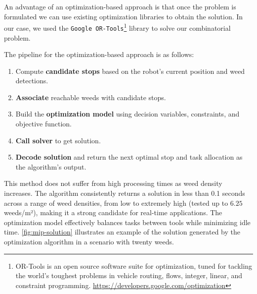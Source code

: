 An advantage of an optimization-based approach is that once the problem is formulated we can use existing optimization libraries to obtain the solution. In our case, we used the \texttt{Google OR-Tools}\footnote{OR-Tools is an open source software suite for optimization, tuned for tackling the world's toughest problems in vehicle routing, flows, integer, linear, and constraint programming. \url{https://developers.google.com/optimization}} library to solve our combinatorial problem.

The pipeline for the optimization-based approach is as follows:
\begin{enumerate}
    \item Compute \textbf{candidate stops} based on the robot's current position and weed detections.
    \item \textbf{Associate} reachable weeds with candidate stops.
    \item Build the \textbf{optimization model} using decision variables, constraints, and objective function.
    \item \textbf{Call solver} to get solution.
    \item \textbf{Decode solution} and return the next optimal stop and task allocation as the algorithm's output.
\end{enumerate}

This method does not suffer from high processing times as weed density increases. The algorithm consistently returns a solution in less than 0.1 seconds across a range of weed densities, from low to extremely high (tested up to $6.25$ weeds/m²), making it a strong candidate for real-time applications. The optimization model effectively balances tasks between tools while minimizing idle time. \autoref{fig:mip-solution} illustrates an example of the solution generated by the optimization algorithm in a scenario with twenty weeds.

